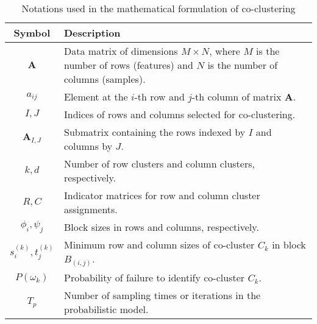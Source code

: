 \begin{table*}[h]
    \centering
    \begin{tabular}{c|p{10cm}}
        \hline
        \textbf{Symbol}        & \textbf{Description}                                                                                                           \\
        \hline
        $\mathbf{A}$           & Data matrix of dimensions $M \times N$, where $M$ is the number of rows (features) and $N$ is the number of columns (samples). \\
        $a_{ij}$               & Element at the $i$-th row and $j$-th column of matrix $\mathbf{A}$.                                                            \\
        $I, J$                 & Indices of rows and columns selected for co-clustering.                                                                        \\
        $\mathbf{A}_{I, J}$    & Submatrix containing the rows indexed by $I$ and columns by $J$.                                                               \\
        $k, d$                 & Number of row clusters and column clusters, respectively.                                                                      \\
        $R, C$                 & Indicator matrices for row and column cluster assignments.                                                                     \\
        $\phi_i, \psi_j$       & Block sizes in rows and columns, respectively.                                                                                 \\
        $s_i^{(k)}, t_j^{(k)}$ & Minimum row and column sizes of co-cluster $C_k$ in block $B_{(i,j)}$.                                                         \\
        $P(\omega_k)$          & Probability of failure to identify co-cluster $C_k$.                                                                           \\
        $T_p$                  & Number of sampling times or iterations in the probabilistic model.                                                             \\
        \hline
    \end{tabular}
    \caption{Notations used in the mathematical formulation of co-clustering}
    \label{tab:notations}
\end{table*}

